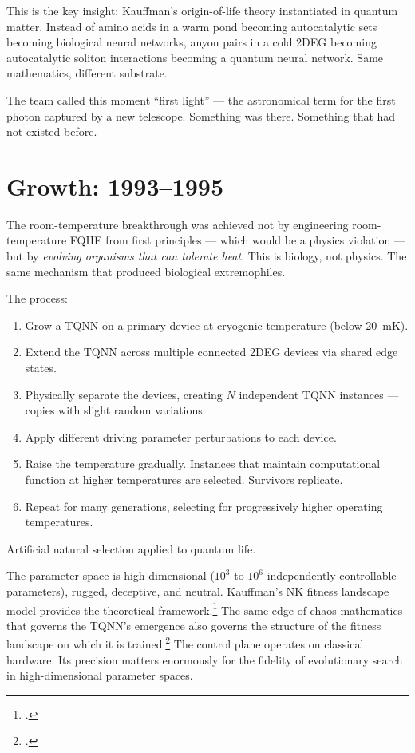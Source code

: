 This is the key insight: Kauffman's origin-of-life theory instantiated in quantum matter. Instead of amino acids in a warm pond becoming autocatalytic sets becoming biological neural networks, anyon pairs in a cold 2DEG becoming autocatalytic soliton interactions becoming a quantum neural network. Same mathematics, different substrate.

The team called this moment ``first light'' --- the astronomical term for the first photon captured by a new telescope. Something was there. Something that had not existed before.

\section*{Growth: 1993--1995}
\label{first-light:growth}

The room-temperature breakthrough was achieved not by engineering room-temperature FQHE from first principles --- which would be a physics violation --- but by \textit{evolving organisms that can tolerate heat}. This is biology, not physics. The same mechanism that produced biological extremophiles.

The process:
\begin{enumerate}
\item Grow a TQNN on a primary device at cryogenic temperature (below 20~mK).
\item Extend the TQNN across multiple connected 2DEG devices via shared edge states.
\item Physically separate the devices, creating $N$ independent TQNN instances --- copies with slight random variations.
\item Apply different driving parameter perturbations to each device.
\item Raise the temperature gradually. Instances that maintain computational function at higher temperatures are selected. Survivors replicate.
\item Repeat for many generations, selecting for progressively higher operating temperatures.
\end{enumerate}

Artificial natural selection applied to quantum life.

The parameter space is high-dimensional ($10^3$ to $10^6$ independently controllable parameters), rugged, deceptive, and neutral. Kauffman's NK fitness landscape model provides the theoretical framework.\footcite{kauffman1993} The same edge-of-chaos mathematics that governs the TQNN's emergence also governs the structure of the fitness landscape on which it is trained.\footcite{vattay2014} The control plane operates on classical hardware. Its precision matters enormously for the fidelity of evolutionary search in high-dimensional parameter spaces.


